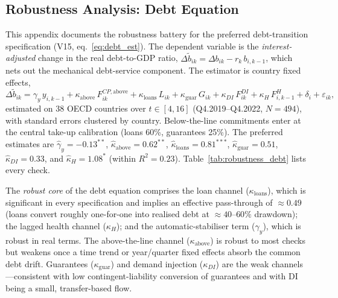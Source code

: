\documentclass[12pt, a4paper]{article}
\begin{document}
\subsection{Robustness Analysis: Debt Equation}
\label{app:robustness_debt}

This appendix documents the robustness battery for the preferred debt-transition
specification (V15, eq.~\ref{eq:debt_est}). The dependent variable is the
\emph{interest-adjusted} change in the real debt-to-GDP ratio,
$\Delta \tilde b_{ik}=\Delta b_{ik}-r_{k}\,b_{i,k-1}$, which nets out the
mechanical debt-service component. The estimator is country fixed effects,
\[
\Delta \tilde b_{ik}= \gamma_y\,y_{i,k-1}
   +\kappa_{\text{above}}\,F^{CP,\text{above}}_{ik}
   +\kappa_{\text{loans}}\,L_{ik}
   +\kappa_{\text{guar}}\,G_{ik}
   +\kappa_{DI}\,F^{DI}_{ik}
   +\kappa_{H}\,F^{H}_{i,k-1}
   +\delta_i+\varepsilon_{ik},
\]
estimated on 38 OECD countries over $t\in[4,16]$ (Q4.2019--Q4.2022, $N=494$),
with standard errors clustered by country. Below-the-line commitments enter at
the central take-up calibration (loans 60\%, guarantees 25\%). The preferred
estimates are
$\hat\gamma_y=-0.13^{**}$, $\hat\kappa_{\text{above}}=0.62^{**}$,
$\hat\kappa_{\text{loans}}=0.81^{***}$, $\hat\kappa_{\text{guar}}=0.51$,
$\hat\kappa_{DI}=0.33$, and $\hat\kappa_{H}=1.08^{*}$
(within $R^2=0.23$). Table~\ref{tab:robustness_debt} lists every check.

The \emph{robust core} of the debt equation comprises the loan channel
($\kappa_{\text{loans}}$), which is significant in every specification and
implies an effective pass-through of $\approx 0.49$ (loans convert roughly
one-for-one into realised debt at $\approx 40$--$60\%$ drawdown); the lagged
health channel ($\kappa_{H}$); and the automatic-stabiliser term
($\gamma_y$), which is robust in real terms. The above-the-line channel
($\kappa_{\text{above}}$) is robust to most checks but weakens once a time
trend or year/quarter fixed effects absorb the common debt drift. Guarantees
($\kappa_{\text{guar}}$) and demand injection ($\kappa_{DI}$) are the weak
channels---consistent with low contingent-liability conversion of guarantees
and with DI being a small, transfer-based flow.
\end{document}
